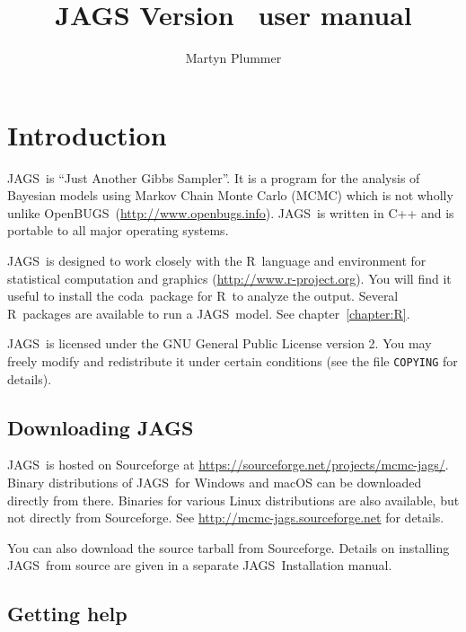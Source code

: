 \documentclass[11pt, a4paper, titlepage]{report}
\newcommand{\JAGS}{\textsf{JAGS}}
\newcommand{\OpenBUGS}{\textsf{OpenBUGS}}
\newcommand{\R}{\textsf{R}}
\newcommand{\CODA}{\textsf{coda}}
\begin{document}


\title{JAGS Version \jagsversion\ user manual}
\author{Martyn Plummer}
\maketitle

\tableofcontents

\chapter{Introduction}

\JAGS\ is ``Just Another Gibbs Sampler''.  It is a program for the
analysis of Bayesian models using Markov Chain Monte Carlo (MCMC)
which is not wholly unlike
\OpenBUGS\ (\url{http://www.openbugs.info}). \JAGS\ is written in
C++ and is portable to all major operating systems. %

\JAGS\ is designed to work closely with the \R\ language and
environment for statistical computation and graphics
(\url{http://www.r-project.org}).  You will find it useful to install
the \CODA\ package for \R\ to analyze the output. Several \R\ packages
are available to run a \JAGS\ model. See chapter~\ref{chapter:R}.

\JAGS\ is licensed under the GNU General Public License version 2. You
may freely modify and redistribute it under certain conditions (see
the file \texttt{COPYING} for details).

\section{Downloading \JAGS}

\JAGS\ is hosted on Sourceforge at
\url{https://sourceforge.net/projects/mcmc-jags/}. Binary
distributions of \JAGS\ for Windows and macOS can be downloaded
directly from there.  Binaries for various Linux distributions are
also available, but not directly from Sourceforge. See
\url{http://mcmc-jags.sourceforge.net} for details.

You can also download the source tarball from Sourceforge. Details
on installing \JAGS\ from source are given in a separate \JAGS\
Installation manual.

\section{Getting help}
\label{section:help}
\end{document}

